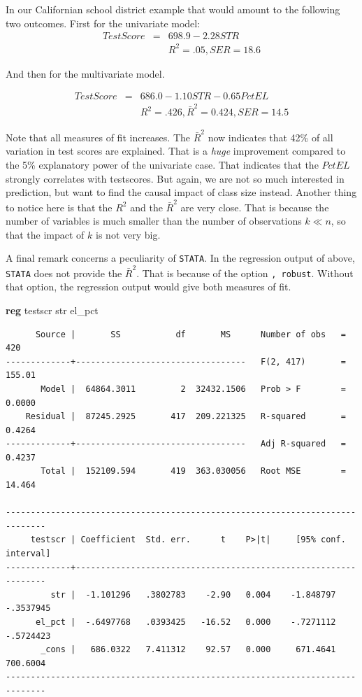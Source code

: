 \documentclass[
]{book}
\newenvironment{Shaded}{\begin{snugshade}}{\end{snugshade}}
\newcommand{\KeywordTok}[1]{\textcolor[rgb]{0.13,0.29,0.53}{\textbf{#1}}}
\newcommand{\NormalTok}[1]{#1}
\begin{document}
In our Californian school district example that would amount to the following two outcomes. First for the univariate model:
\begin{eqnarray}
TestScore &= &698.9- 2.28  STR \\
&&R^2 = .05, SER = 18.6
\end{eqnarray}

And then for the multivariate model.

\begin{eqnarray}
TestScore &=& 686.0 - 1.10  STR - 0.65 PctEL \\
&&R^2=.426, \bar{R}^2=0.424, SER = 14.5
\end{eqnarray}

Note that all measures of fit increases. The \(\bar{R}^2\) now indicates that 42\% of all variation in test scores are explained. That is a \emph{huge} improvement compared to the 5\% explanatory power of the univariate case. That indicates that the \(PctEL\) strongly correlates with testscores. But again, we are not so much interested in prediction, but want to find the causal impact of class size instead. Another thing to notice here is that the \(R^2\) and the \(\bar{R}^2\) are very close. That is because the number of variables is much smaller than the number of observations \(k \ll n\), so that the impact of \(k\) is not very big.

A final remark concerns a peculiarity of \texttt{STATA}. In the regression output of above, \texttt{STATA} does not provide the \(\bar{R}^2\). That is because of the option \texttt{,\ robust}. Without that option, the regression output would give both measures of fit.

\begin{Shaded}
\begin{Highlighting}[]
\KeywordTok{reg}\NormalTok{ testscr str el\_pct}
\end{Highlighting}
\end{Shaded}

\begin{verbatim}
      Source |       SS           df       MS      Number of obs   =       420
-------------+----------------------------------   F(2, 417)       =    155.01
       Model |  64864.3011         2  32432.1506   Prob > F        =    0.0000
    Residual |  87245.2925       417  209.221325   R-squared       =    0.4264
-------------+----------------------------------   Adj R-squared   =    0.4237
       Total |  152109.594       419  363.030056   Root MSE        =    14.464

------------------------------------------------------------------------------
     testscr | Coefficient  Std. err.      t    P>|t|     [95% conf. interval]
-------------+----------------------------------------------------------------
         str |  -1.101296   .3802783    -2.90   0.004    -1.848797   -.3537945
      el_pct |  -.6497768   .0393425   -16.52   0.000    -.7271112   -.5724423
       _cons |   686.0322   7.411312    92.57   0.000     671.4641    700.6004
------------------------------------------------------------------------------
\end{verbatim}
\end{document}

